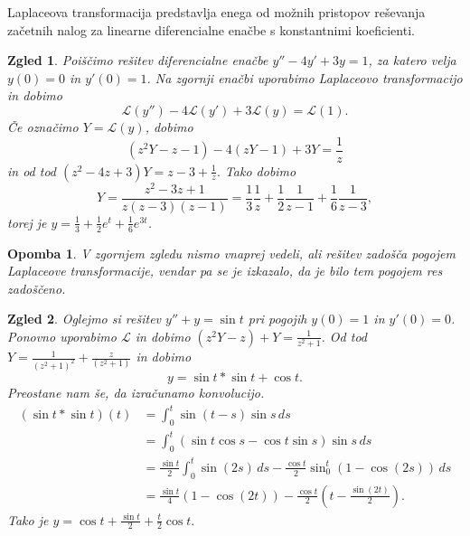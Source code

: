 \documentclass[10pt, a4paper]{article}
\newtheorem*{opomba}{Opomba}
\newtheorem{zgled}{Zgled}[section]
\begin{document}
Laplaceova transformacija predstavlja enega od možnih pristopov reševanja začetnih nalog 
za linearne diferencialne enačbe s konstantnimi koeficienti.

\begin{zgled}
  Poiščimo rešitev diferencialne enačbe $y'' - 4 y' + 3y = 1$,
  za katero velja $y(0) = 0$ in $y'(0) = 1$.
  Na zgornji enačbi uporabimo Laplaceovo transformacijo in dobimo 
  $$\mathcal{L} (y'') - 4 \mathcal{L} (y') + 3 \mathcal{L} (y) = \mathcal{L}(1).$$
  Če označimo $Y = \mathcal{L} (y)$, dobimo 
  $$(z^2 Y - z - 1) - 4 (zY - 1) + 3 Y = \frac{1}{z}$$
  in od tod 
  $(z^2 - 4z + 3)Y = z - 3 + \frac{1}{z}.$
  Tako dobimo $$Y = \frac{z^2 - 3z + 1}{z(z - 3) (z - 1)} = \frac{1}{3} \frac{1}{z} + \frac{1}{2} \frac{1}{z - 1} + \frac{1}{6} \frac{1}{z - 3},$$
  torej je $y = \frac{1}{3} + \frac{1}{2} e^t + \frac{1}{6} e^{3t}$.
\end{zgled}

\begin{opomba}
  V zgornjem zgledu nismo vnaprej vedeli, ali rešitev zadošča pogojem Laplaceove transformacije,
  vendar pa se je izkazalo, da je bilo tem pogojem res zadoščeno.
\end{opomba}

\begin{zgled}
  Oglejmo si rešitev $y'' + y = \sin t$ pri pogojih $y(0) = 1$ in $y'(0) = 0$.
  Ponovno uporabimo $\mathcal{L}$ in dobimo $(z^2 Y - z) + Y = \frac{1}{z^2 + 1}$.
  Od tod 
  $Y = \frac{1}{(z^2 + 1)^2} + \frac{z}{(z^2 + 1)}$ in dobimo 
  $$y = \sin t * \sin t + \cos t.$$
  Preostane nam še, da izračunamo konvolucijo.
  \begin{align*}
    (\sin t * \sin t) (t) &= \int_0 ^t \sin (t - s) \sin s\, ds\\
    &= \int_0 ^t (\sin t \cos s - \cos t \sin s) \sin s\, ds\\
    &= \frac{\sin t}{2} \int_0 ^t \sin (2s)\, ds - \frac{\cos t}{2} \sin_0 ^t (1 - \cos (2s))\, ds\\
    &= \frac{\sin t}{4} (1 - \cos (2t)) - \frac{\cos t}{2} (t - \frac{\sin (2t)}{2}).
  \end{align*}
  Tako je $y = \cos t + \frac{\sin t}{2} + \frac{t}{2} \cos t.$
\end{zgled} 
\end{document}
